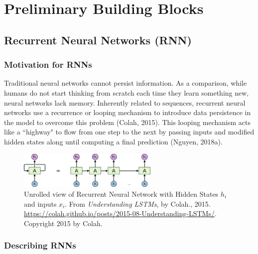 \section{Preliminary Building Blocks}

\subsection{Recurrent Neural Networks (RNN)}

\subsubsection{Motivation for RNNs}

Traditional neural networks cannot persist information. As a comparison, while humans do not start thinking from scratch each time they learn something new, neural networks lack memory. Inherently related to sequences, recurrent neural networks use a recurrence or looping mechanism to introduce data persistence in the model to overcome this problem (Colah, 2015). This looping mechanism acts like a ``highway" to flow from one step to the next by passing inputs and modified hidden states along until computing a final prediction (Nguyen, 2018a). 

\begin{figure}[h]
\vspace{-5pt}
\centering
\includegraphics[width=0.6\textwidth]{imgs/rnn_colah_unrolled.png}
\vspace{-5pt}
\caption{\footnotesize Unrolled view of Recurrent Neural Network with Hidden States $h_i$ and inputs $x_i$. From \emph{Understanding LSTMs}, by Colah., 2015. \url{https://colah.github.io/posts/2015-08-Understanding-LSTMs/}. Copyright 2015 by Colah.}
\vspace{-5pt}
\end{figure}


\subsubsection{Describing RNNs}

